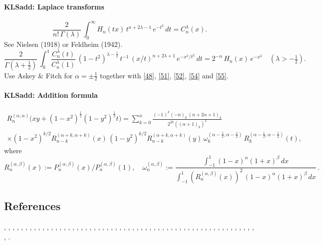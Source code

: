 \documentclass[envcountchap,graybox]{svmono}
\renewcommand{\Gamma}{\varGamma}
\newcommand\al\alpha
\newcommand\be\beta
\newcommand\la\lambda
\newcommand\om\omega
\newcommand\Ga{\Gamma}
\newcommand\half{\frac12}
\newcommand\thalf{\tfrac12}
\newcommand\iy\infty
\begin{document}
\paragraph{\large\bf KLSadd: Laplace transforms}\begin{equation}
\frac2{n!\,\Ga(\la)}\,
\int_0^\iy H_n(tx)\,t^{n+2\la-1}\,e^{-t^2}\,dt=C_n^\la(x).
\label{56}
\end{equation}
See Nielsen \cite[p.48, (4) with p.47, (1) and p.28, (10)]{K4} (1918)
or Feldheim \cite[(28)]{K3} (1942).
\begin{equation}
\frac2{\Ga(\la+\thalf)}\,\int_0^1 \frac{C_n^\la(t)}{C_n^\la(1)}\,
(1-t^2)^{\la-\half}\,t^{-1}\,(x/t)^{n+2\la+1}\,e^{-x^2/t^2}\,dt
=2^{-n}\,H_n(x)\,e^{-x^2}\quad(\la>-\thalf).
\label{46}
\end{equation}
Use Askey \& Fitch \cite[(3.29)]{K2} for $\al=\pm\thalf$ together with
\eqref{48}, \eqref{51}, \eqref{52}, \eqref{54} and \eqref{55}.
\paragraph{\large\bf KLSadd: Addition formula}\begin{multline}
R_n^{(\al,\al)}\big(xy+(1-x^2)^\half(1-y^2)^\half t\big)
=\sum_{k=0}^n \frac{(-1)^k(-n)_k\,(n+2\al+1)_k}{2^{2k}((\al+1)_k)^2}\\
\times(1-x^2)^{k/2} R_{n-k}^{(\al+k,\al+k)}(x)\,(1-y^2)^{k/2} R_{n-k}^{(\al+k,\al+k)}(y)\,
\om_k^{(\al-\half,\al-\half)}\,R_k^{(\al-\half,\al-\half)}(t),
\label{108}
\end{multline}
where
\[
R_n^{(\al,\be)}(x):=P_n^{(\al,\be)}(x)/P_n^{(\al,\be)}(1),\quad
\om_n^{(\al,\be)}:=\frac{\int_{-1}^1 (1-x)^\al(1+x)^\be\,dx}
{\int_{-1}^1 (R_n^{(\al,\be)}(x))^2\,(1-x)^\al(1+x)^\be\,dx}\,.
\]
%
\subsection*{References}
\cite{Abram}, \cite{Ahmed+86}, \cite{AndrewsAskeyRoy}, \cite{Area+I}, \cite{Askey67}, \cite{Askey74}, \cite{Askey75},
\cite{Askey89I}, \cite{AskeyFitch}, \cite{AskeyKoornRahman}, \cite{Berg}, \cite{BilodeauI},
\cite{BojanovNikolov}, \cite{Brafman51}, \cite{Brafman57I}, \cite{Brown},
\cite{BustozIsmail82}, \cite{BustozIsmail83}, \cite{BustozIsmail89}, \cite{BustozSavage79},
\cite{BustozSavage80}, \cite{Carlitz61II}, \cite{Chihara78}, \cite{Common}, \cite{Danese},
\cite{Dette94}, \cite{DijksmaKoorn}, \cite{DilcherStolarsky}, \cite{Dimitrov96},
\cite{Dimitrov2003}, \cite{Doha2002II}, \cite{Driver}, \cite{ElbertLaforgia86I},
\cite{ElbertLaforgia86II}, \cite{ElbertLaforgia90}, \cite{Erdelyi+}, \cite{Exton96},
\cite{Gasper69}, \cite{Gasper72II}, \cite{Gasper85}, \cite{Grad}, \cite{Ismail74},
\cite{Ismail2005II}, \cite{Koekoek2000}, \cite{Koorn88}, \cite{Laforgia}, \cite{LewanowiczI},
\cite{Lorch}, \cite{Mathai}, \cite{Nagel}, \cite{Nikiforov+}, \cite{NikiforovUvarov},
\cite{RahmanShah}, \cite{Rainville}, \cite{Reimer}, \cite{Sartoretto}, \cite{Srivastava71},
\cite{Szego75}, \cite{Temme}, \cite{Viswanathan}, \cite{Zayed}.
\end{document}
